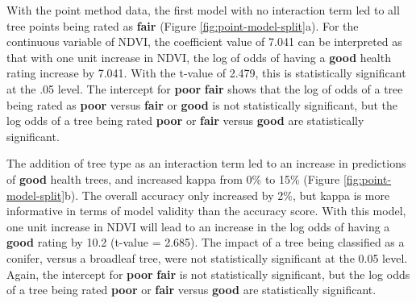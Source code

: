 \documentclass[12pt,twoside]{reedthesis}
\begin{document}
With the point method data, the first model with no interaction term led to all tree points being rated as \textbf{fair} (Figure \ref{fig:point-model-split}a). For the continuous variable of NDVI, the coefficient value of 7.041 can be interpreted as that with one unit increase in NDVI, the log of odds of having a \textbf{good} health rating increase by 7.041. With the t-value of 2.479, this is statistically significant at the .05 level. The intercept for \textbf{poor} \textbar{} \textbf{fair} shows that the log of odds of a tree being rated as \textbf{poor} versus \textbf{fair} or \textbf{good} is not statistically significant, but the log odds of a tree being rated \textbf{poor} or \textbf{fair} versus \textbf{good} are statistically significant.

The addition of tree type as an interaction term led to an increase in predictions of \textbf{good} health trees, and increased kappa from 0\% to 15\% (Figure \ref{fig:point-model-split}b). The overall accuracy only increased by 2\%, but kappa is more informative in terms of model validity than the accuracy score. With this model, one unit increase in NDVI will lead to an increase in the log odds of having a \textbf{good} rating by 10.2 (t-value = 2.685). The impact of a tree being classified as a conifer, versus a broadleaf tree, were not statistically significant at the 0.05 level. Again, the intercept for \textbf{poor} \textbar{} \textbf{fair} is not statistically significant, but the log odds of a tree being rated \textbf{poor} or \textbf{fair} versus \textbf{good} are statistically significant.
\end{document}
